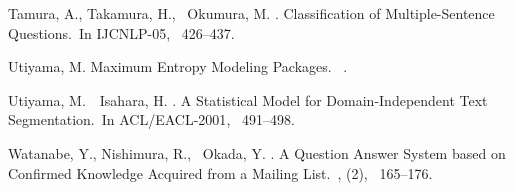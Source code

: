 \documentclass[english]{jnlp_1.4}
\begin{document}
\begin{thebibliography}{}
Tamura, A., Takamura, H., \BBA\ Okumura, M. \BBCP.
\newblock \BBOQ Classification of Multiple-Sentence Questions.\BBCQ\
\newblock In {\Bem IJCNLP-05}, \mbox{\BPGS\ 426--437}.

Utiyama, M.
\newblock \BBOQ Maximum Entropy Modeling Packages.\BBCQ\
\newblock
  .

Utiyama, M.\BBACOMMA\ \BBA\ Isahara, H. \BBCP.
\newblock \BBOQ A Statistical Model for Domain-Independent Text
  Segmentation.\BBCQ\
\newblock In {\Bem ACL/EACL-2001}, \mbox{\BPGS\ 491--498}.

Watanabe, Y., Nishimura, R., \BBA\ Okada, Y. \BBOP 2008\BBCP.
\newblock \BBOQ A Question Answer System based on Confirmed Knowledge Acquired
  from a Mailing List.\BBCQ\
, {}  (2), \mbox{\BPGS\
  165--176}.

\end{thebibliography}
\end{document}
